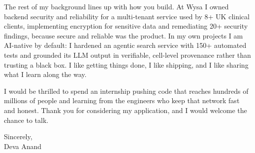 \documentclass[letterpaper,11pt]{article}
\begin{document}
The rest of my background lines up with how you build. At Wysa I owned backend security and reliability for a multi-tenant service used by 8+ UK clinical clients, implementing encryption for sensitive data and remediating 20+ security findings, because secure and reliable was the product. In my own projects I am AI-native by default: I hardened an agentic search service with 150+ automated tests and grounded its LLM output in verifiable, cell-level provenance rather than trusting a black box. I like getting things done, I like shipping, and I like sharing what I learn along the way.

I would be thrilled to spend an internship pushing code that reaches hundreds of millions of people and learning from the engineers who keep that network fast and honest. Thank you for considering my application, and I would welcome the chance to talk.

\vspace{6pt}

\noindent Sincerely,\\
Deva Anand
\end{document}
